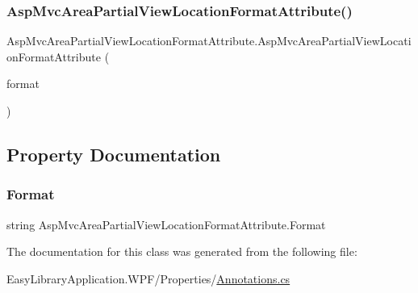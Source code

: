 \subsubsection{\texorpdfstring{Asp\+Mvc\+Area\+Partial\+View\+Location\+Format\+Attribute()}{AspMvcAreaPartialViewLocationFormatAttribute()}}
{\footnotesize\ttfamily Asp\+Mvc\+Area\+Partial\+View\+Location\+Format\+Attribute.\+Asp\+Mvc\+Area\+Partial\+View\+Location\+Format\+Attribute (\begin{DoxyParamCaption}\item[{\mbox{[}\+Not\+Null\mbox{]} string}]{format }\end{DoxyParamCaption})}



\subsection{Property Documentation}
\mbox{\label{class_asp_mvc_area_partial_view_location_format_attribute_a9de8c471614445bbbcbf2051209ec446}} 
\subsubsection{\texorpdfstring{Format}{Format}}
{\footnotesize\ttfamily string Asp\+Mvc\+Area\+Partial\+View\+Location\+Format\+Attribute.\+Format\hspace{0.3cm}{\ttfamily [get]}}



The documentation for this class was generated from the following file\+:\begin{DoxyCompactItemize}
\item 
Easy\+Library\+Application.\+W\+P\+F/\+Properties/\mbox{\hyperlink{_annotations_8cs}{Annotations.\+cs}}\end{DoxyCompactItemize}
